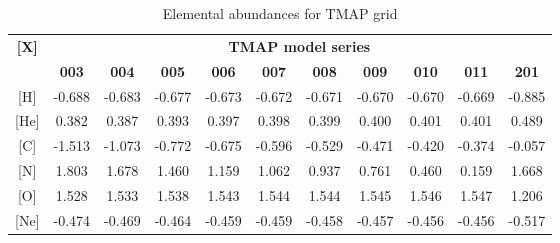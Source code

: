 				\begin{table}[h!]
					\centering
					\caption{Elemental abundances for TMAP grid}
					\label{rauch:abundances}
					\begin{tabular}{ccccccccccc}
						\hline
						\multirow{2}{*}{\textbf{{[}X{]}}} & \multicolumn{10}{c}{\textbf{TMAP model series}} \\ \cline{2-11} & \multicolumn{1}{c}{\textbf{003}} & \multicolumn{1}{c}{\textbf{004}} & \multicolumn{1}{c}{\textbf{005}} & \multicolumn{1}{c}{\textbf{006}} & \multicolumn{1}{c}{\textbf{007}} & \multicolumn{1}{c}{\textbf{008}} & \multicolumn{1}{c}{\textbf{009}} & \multicolumn{1}{c}{\textbf{010}} & \multicolumn{1}{c}{\textbf{011}} & \textbf{201} \\ \hline
						{[}H{]} & \multicolumn{1}{c}{-0.688} & \multicolumn{1}{c}{-0.683} & \multicolumn{1}{c}{-0.677} & \multicolumn{1}{c}{-0.673} & \multicolumn{1}{c}{-0.672} & \multicolumn{1}{c}{-0.671} & \multicolumn{1}{c}{-0.670} & \multicolumn{1}{c}{-0.670} & \multicolumn{1}{c}{-0.669} & -0.885 \\ %
						{[}He{]} & \multicolumn{1}{c}{0.382} & \multicolumn{1}{c}{0.387} & \multicolumn{1}{c}{0.393} & \multicolumn{1}{c}{0.397} & \multicolumn{1}{c}{0.398} & \multicolumn{1}{c}{0.399} & \multicolumn{1}{c}{0.400} & \multicolumn{1}{c}{0.401} & \multicolumn{1}{c}{0.401} & 0.489 \\ %
						{[}C{]} & \multicolumn{1}{c}{-1.513} & \multicolumn{1}{c}{-1.073} & \multicolumn{1}{c}{-0.772} & \multicolumn{1}{c}{-0.675} & \multicolumn{1}{c}{-0.596} & \multicolumn{1}{c}{-0.529} & \multicolumn{1}{c}{-0.471} & \multicolumn{1}{c}{-0.420} & \multicolumn{1}{c}{-0.374} & -0.057 \\ %
						{[}N{]} & \multicolumn{1}{c}{1.803} & \multicolumn{1}{c}{1.678} & \multicolumn{1}{c}{1.460} & \multicolumn{1}{c}{1.159} & \multicolumn{1}{c}{1.062} & \multicolumn{1}{c}{0.937} & \multicolumn{1}{c}{0.761} & \multicolumn{1}{c}{0.460} & \multicolumn{1}{c}{0.159} & 1.668 \\ %
						{[}O{]} & \multicolumn{1}{c}{1.528} & \multicolumn{1}{c}{1.533} & \multicolumn{1}{c}{1.538} & \multicolumn{1}{c}{1.543} & \multicolumn{1}{c}{1.544} & \multicolumn{1}{c}{1.544} & \multicolumn{1}{c}{1.545} & \multicolumn{1}{c}{1.546} & \multicolumn{1}{c}{1.547} & 1.206 \\ %
						{[}Ne{]} & \multicolumn{1}{c}{-0.474} & \multicolumn{1}{c}{-0.469} & \multicolumn{1}{c}{-0.464} & \multicolumn{1}{c}{-0.459} & \multicolumn{1}{c}{-0.459} & \multicolumn{1}{c}{-0.458} & \multicolumn{1}{c}{-0.457} & \multicolumn{1}{c}{-0.456} & \multicolumn{1}{c}{-0.456} & -0.517 \\ %

\end{tabular}
\end{table}
